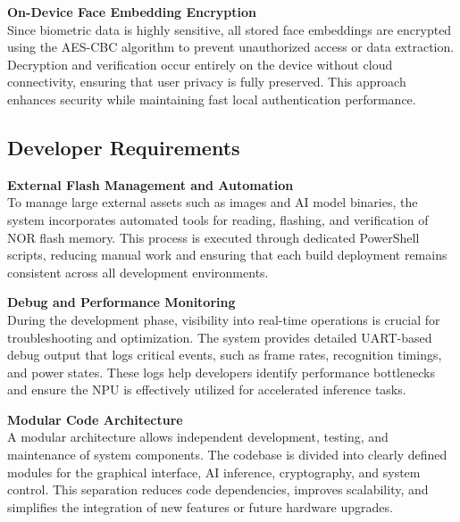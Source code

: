 \vspace{0.5em}
\textbf{On-Device Face Embedding Encryption}\\
Since biometric data is highly sensitive, all stored face embeddings are encrypted using the AES-CBC algorithm to prevent unauthorized access or data extraction. Decryption and verification occur entirely on the device without cloud connectivity, ensuring that user privacy is fully preserved. This approach enhances security while maintaining fast local authentication performance.

\vspace{1em}


\subsection*{Developer Requirements}

\textbf{External Flash Management and Automation}\\
To manage large external assets such as images and AI model binaries, the system incorporates automated tools for reading, flashing, and verification of NOR flash memory. This process is executed through dedicated PowerShell scripts, reducing manual work and ensuring that each build deployment remains consistent across all development environments.

\vspace{0.5em}
\textbf{Debug and Performance Monitoring}\\
During the development phase, visibility into real-time operations is crucial for troubleshooting and optimization. The system provides detailed UART-based debug output that logs critical events, such as frame rates, recognition timings, and power states. These logs help developers identify performance bottlenecks and ensure the NPU is effectively utilized for accelerated inference tasks.

\vspace{0.5em}
\textbf{Modular Code Architecture}\\
A modular architecture allows independent development, testing, and maintenance of system components. The codebase is divided into clearly defined modules for the graphical interface, AI inference, cryptography, and system control. This separation reduces code dependencies, improves scalability, and simplifies the integration of new features or future hardware upgrades.





